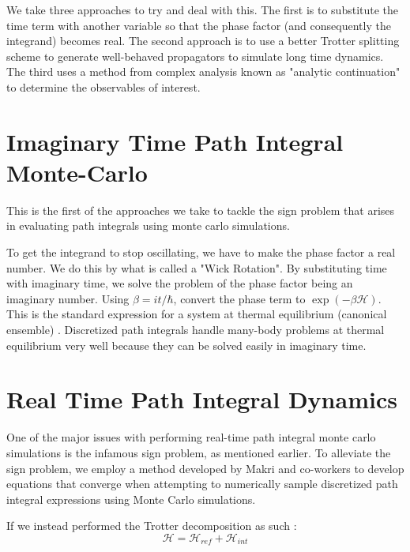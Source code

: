 We take three approaches to try and deal with this. The first is to substitute the time term with another variable so that the phase factor (and consequently the integrand) becomes real. The second approach is to use a better Trotter splitting scheme to generate well-behaved propagators to simulate long time dynamics. The third uses a method from complex analysis known as "analytic continuation" to determine the observables of interest.

\section{Imaginary Time Path Integral Monte-Carlo}

This is the first of the approaches we take to tackle the sign problem that arises in evaluating path integrals using monte carlo simulations. 

To get the integrand to stop oscillating, we have to make the phase factor a real number. We do this by what is called a "Wick Rotation". By substituting time with imaginary time, we solve the problem of the phase factor being an imaginary number. Using $\beta = it/\hbar$, convert the phase term to $\exp(-\beta \mathcal{H})$. This is the standard expression for a system at thermal equilibrium (canonical ensemble) \cite{tuckerman2023statistical}. Discretized path integrals handle many-body problems at thermal equilibrium very well because they can be solved easily in imaginary time.

\section{Real Time Path Integral Dynamics}

One of the major issues with performing real-time path integral monte carlo simulations is the infamous sign problem, as mentioned earlier. 
To alleviate the sign problem, we employ a method developed by Makri and co-workers \cite{quapi} to develop equations that converge when attempting to numerically sample discretized path integral expressions using Monte Carlo simulations.


 If we instead performed the Trotter decomposition as such : 
 \begin{equation}
\mathcal{H} = \mathcal{H}_{ref} + \mathcal{H}_{int}
 \end{equation}

